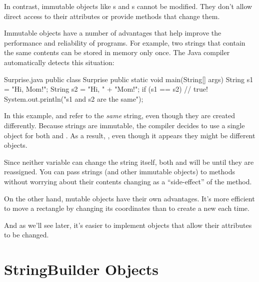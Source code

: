 In contrast, immutable objects like s and s cannot be modified.
They don't allow direct access to their attributes or provide methods that change them.

Immutable objects have a number of advantages that help improve the performance and reliability of programs.
For example, two strings that contain the same contents can be stored in memory only once.
The Java compiler automatically detects this situation:



\begin{trinket}[265]{Surprise.java}
public class Surprise {
    public static void main(String[] args) {
        String s1 = "Hi, Mom!";
        String s2 = "Hi, " + "Mom!";
        if (s1 == s2) {                // true!
            System.out.println("s1 and s2 are the same");
        }
    }
}
\end{trinket}

In this example,  and  refer to the {\em same} string, even though they are created differently.
Because strings are immutable, the compiler decides to use a single object for both  and .
As a result, , even though it appears they might be different objects.

Since neither variable can change the string itself, both  and  will be  until they are reassigned.
You can pass strings (and other immutable objects) to methods without worrying about their contents changing as a ``side-effect'' of the method.


On the other hand, mutable objects have their own advantages.
It's more efficient to move a rectangle by changing its coordinates than to create a new  each time.

And as we'll see later, it's easier to implement objects that allow their attributes to be changed.


\section{StringBuilder Objects}
\label{stringbuilder}

